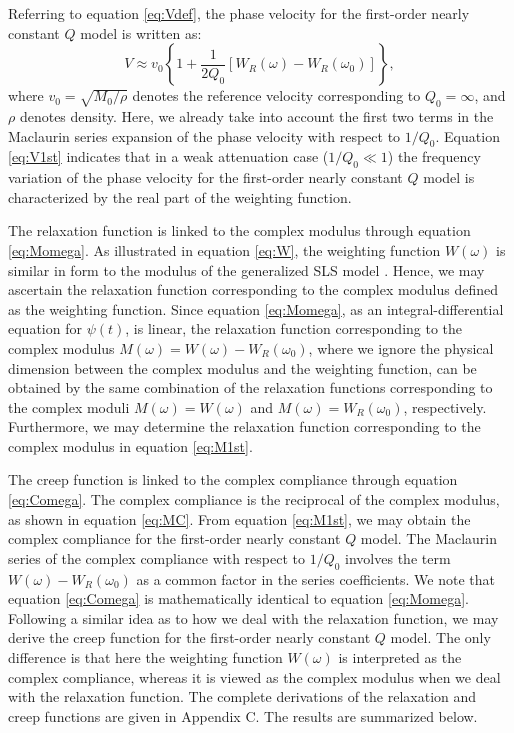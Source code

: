 \documentclass[article]{./macros/elsarticle_qh}
\begin{document}
Referring to equation \ref{eq:Vdef}, the phase velocity for the first-order nearly constant $Q$ model is written as:
\begin{equation} \label{eq:V1st}
V \approx v_{0} \left\{
1 + \frac{1}{2Q_{0}} \left[ W_{R}(\omega) - W_{R} (\omega_{0}) \right] 
\right\} ,
\end{equation}
where $v_{0} = \sqrt{M_{0}/\rho}$ denotes the reference velocity corresponding to $Q_{0} = \infty$, and $\rho$ denotes density. 
Here, we already take into account the first two terms in the Maclaurin series expansion of the phase velocity with respect to $1/Q_{0}$.   
Equation \ref{eq:V1st} indicates that in a weak attenuation case ($1/Q_{0} \ll 1$) the frequency variation of the phase velocity for the first-order nearly constant $Q$ model is characterized by the real part of the weighting function. 

The relaxation function is linked to the complex modulus through equation \ref{eq:Momega}. As illustrated in equation \ref{eq:W}, the weighting function $W(\omega)$ is similar in form to the modulus of the generalized SLS model \cite[]{hao.greenhalgh:2019}. Hence, we may ascertain the relaxation function corresponding to the complex modulus defined as the weighting function. Since equation \ref{eq:Momega}, as an integral-differential equation for $\psi(t)$, is linear, the relaxation function corresponding to the complex modulus $M(\omega) = W(\omega) - W_{R}(\omega_{0})$, where we ignore the physical dimension between the complex modulus and the weighting function, can be obtained by the same combination of the relaxation functions corresponding to the complex moduli $M(\omega) = W(\omega)$ and $M(\omega) = W_{R}(\omega_{0})$, respectively. Furthermore, we may determine the relaxation function corresponding to the complex modulus in equation \ref{eq:M1st}.

The creep function is linked to the complex compliance through equation \ref{eq:Comega}. The complex compliance is the reciprocal of the complex modulus, as shown in equation \ref{eq:MC}. From equation \ref{eq:M1st}, we may obtain the complex compliance for the first-order nearly constant $Q$ model. The Maclaurin series of the complex compliance with respect to $1/Q_{0}$ involves the term $W(\omega) - W_{R}(\omega_{0})$ as a common factor in the series coefficients. We note that equation \ref{eq:Comega} is mathematically identical to equation \ref{eq:Momega}. Following a similar idea as to how we deal with the relaxation function, we may derive the creep function for the first-order nearly constant $Q$ model. The only difference is that here the weighting function $W(\omega)$ is interpreted as the complex compliance, whereas it is viewed as the complex modulus when we deal with the relaxation function. The complete derivations of the relaxation and creep functions are given in Appendix C. The results are summarized below. 
\end{document}
